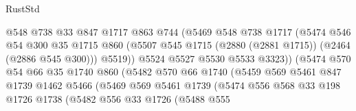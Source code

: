 \begin{lexlean}{RustStd}
\begin{coremodule}
                                @548
                                @738
                                @33
                                @847
                                @1717
                                @863
                                @744
                                (@5469
                                  @548
                                  @738
                                  @1717
                                  (@5474
                                    @546
                                    @54
                                    @300
                                    @35
                                    @1715
                                    @860
                                    (@5507
                                      @545
                                      @1715
                                      (@2880 (@2881 @1715))
                                      (@2464 (@2886 @545 @300)))
                                    @5519))
                                @5524
                                @5527
                                @5530
                                @5533
                                @3323))
                            (@5474
                              @570
                              @54
                              @66
                              @35
                              @1740
                              @860
                              (@5482
                                @570
                                @66
                                @1740
                                (@5459
                                  @569
                                  @5461
                                  @847
                                  @1739
                                  @1462
                                  @5466
                                  (@5469
                                    @569
                                    @5461
                                    @1739
                                    (@5474
                                      @556
                                      @568
                                      @33
                                      @198
                                      @1726
                                      @1738
                                      (@5482
                                        @556
                                        @33
                                        @1726
                                        (@5488
                                          @555

\end{coremodule}
\end{lexlean}
